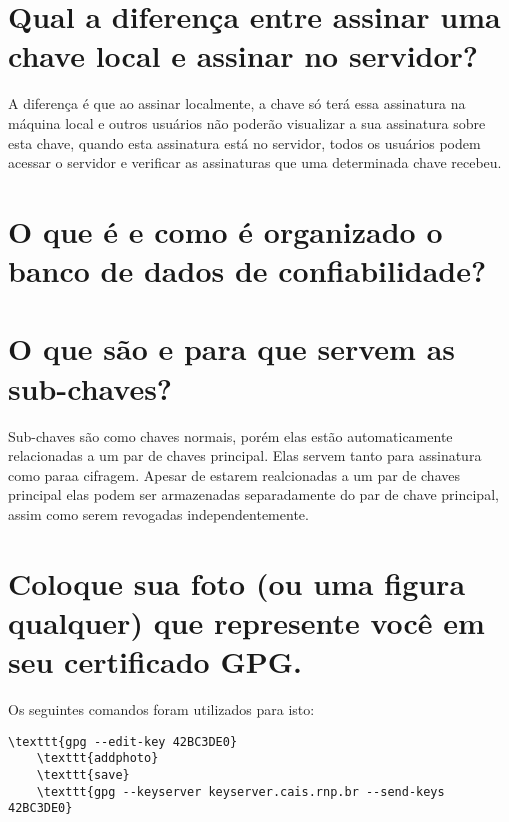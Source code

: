 \documentclass[
    article,            %
    11pt,               %
    oneside,            %
    a4paper,            %
    english,            %
    brazil,             %
    sumario=tradicional,
    ]{abntex2}
\begin{document}
\section{Qual a diferença entre assinar uma chave local e assinar no servidor?}

A diferença é que ao assinar localmente, a chave só terá essa assinatura na máquina local e outros usuários não poderão visualizar a sua assinatura sobre esta chave, quando esta assinatura está no servidor, todos os usuários podem acessar o servidor e verificar as assinaturas que uma determinada chave recebeu.

\section{O que é e como é organizado o banco de dados de confiabilidade?}


\section{O que são e para que servem as sub-chaves?}

Sub-chaves são como chaves normais, porém elas estão automaticamente relacionadas a um par de chaves principal. Elas servem tanto para assinatura como paraa cifragem. Apesar de estarem realcionadas a um par de chaves principal elas podem ser armazenadas separadamente do par de chave principal, assim como serem revogadas independentemente.

\section{Coloque sua foto (ou uma figura qualquer) que represente você em seu certificado GPG.}

Os seguintes comandos foram utilizados para isto: 
\begin{Verbatim}[commandchars=\\\{\}, fontsize=\footnotesize]
    \texttt{gpg --edit-key 42BC3DE0}
    \texttt{addphoto}
    \texttt{save}
    \texttt{gpg --keyserver keyserver.cais.rnp.br --send-keys 42BC3DE0}
\end{Verbatim}
\end{document}
